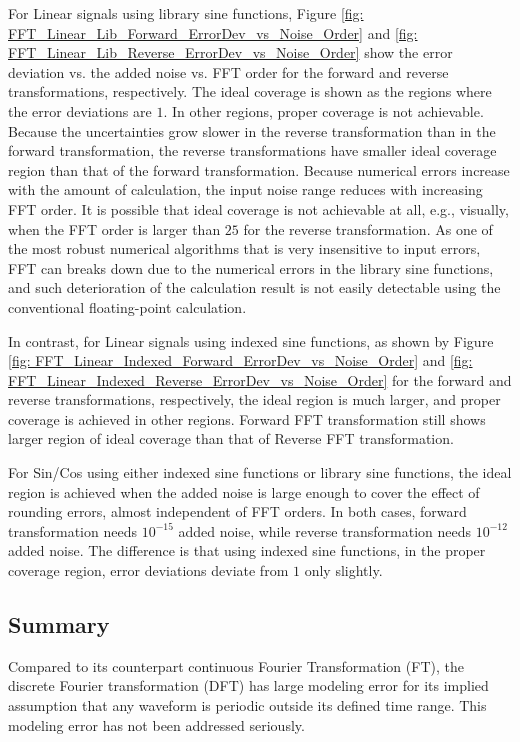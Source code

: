 \documentclass[twoside]{article}
\numberwithin{equation}{section}
\begin{document}
For Linear signals using library sine functions, Figure \ref{fig: FFT_Linear_Lib_Forward_ErrorDev_vs_Noise_Order} and \ref{fig: FFT_Linear_Lib_Reverse_ErrorDev_vs_Noise_Order} show the error deviation vs. the added noise vs. FFT order for the forward and reverse transformations, respectively.
The ideal coverage is shown as the regions where the error deviations are $1$.
In other regions, proper coverage is not achievable.
Because the uncertainties grow slower in the reverse transformation than in the forward transformation, the reverse transformations have smaller ideal coverage region than that of the forward transformation.
Because numerical errors increase with the amount of calculation, the input noise range reduces with increasing FFT order.
It is possible that ideal coverage is not achievable at all, e.g., visually, when the FFT order is larger than $25$ for the reverse transformation.
As one of the most robust numerical algorithms that is very insensitive to input errors, FFT can breaks down due to the numerical errors in the library sine functions, and such deterioration of the calculation result is not easily detectable using the conventional floating-point calculation.

In contrast, for Linear signals using indexed sine functions, as shown by Figure \ref{fig: FFT_Linear_Indexed_Forward_ErrorDev_vs_Noise_Order} and \ref{fig: FFT_Linear_Indexed_Reverse_ErrorDev_vs_Noise_Order} for the forward and reverse transformations, respectively, the ideal region is much larger, and proper coverage is achieved in other regions.
Forward FFT transformation still shows larger region of ideal coverage than that of Reverse FFT transformation.

For Sin/Cos using either indexed sine functions or library sine functions, the ideal region is achieved when the added noise is large enough to cover the effect of rounding errors, almost independent of FFT orders. 
In both cases, forward transformation needs $10^{-15}$ added noise, while reverse transformation needs $10^{-12}$ added noise.
The difference is that using indexed sine functions, in the proper coverage region, error deviations deviate from $1$ only slightly.


\subsection{Summary}

Compared to its counterpart continuous Fourier Transformation (FT), the discrete Fourier transformation (DFT) has large modeling error for its implied assumption that any waveform is periodic outside its defined time range.
This modeling error has not been addressed seriously.
\end{document}
